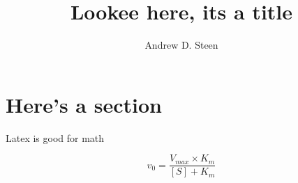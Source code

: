 \documentclass[10pt]{article}
\title{Lookee here, its a title}
\author{Andrew D. Steen}
\affil{University of Tennessee}
\begin{document}
\maketitle

\section{Here's a section}

Latex is good for math

$$
v_0 = \frac{V_{max} \times K_m}{[S] + K_m}
$$
\end{document}
